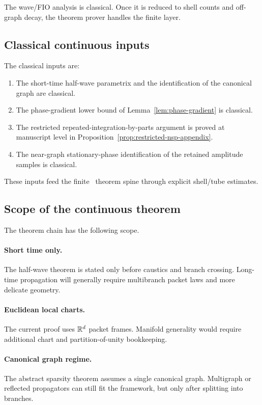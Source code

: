 The wave/FIO analysis is classical. Once it is reduced to shell counts and off-graph decay, the theorem prover handles the finite layer.

\subsection{Classical continuous inputs}

The classical inputs are:
\begin{enumerate}
\item The short-time half-wave parametrix and the identification of the canonical graph are classical.
\item The phase-gradient lower bound of Lemma~\ref{lem:phase-gradient} is classical.
\item The restricted repeated-integration-by-parts argument is proved at manuscript level in Proposition~\ref{prop:restricted-nsp-appendix}.
\item The near-graph stationary-phase identification of the retained amplitude samples is classical.
\end{enumerate}
These inputs feed the finite \MiNO\ theorem spine through explicit shell/tube estimates.

\subsection{Scope of the continuous theorem}

The theorem chain has the following scope.

\paragraph{Short time only.}
The half-wave theorem is stated only before caustics and branch crossing. Long-time propagation will generally require multibranch packet laws and more delicate geometry.

\paragraph{Euclidean local charts.}
The current proof uses $\mathbb R^d$ packet frames. Manifold generality would require additional chart and partition-of-unity bookkeeping.

\paragraph{Canonical graph regime.}
The abstract sparsity theorem assumes a single canonical graph. Multigraph or reflected propagators can still fit the framework, but only after splitting into branches.


